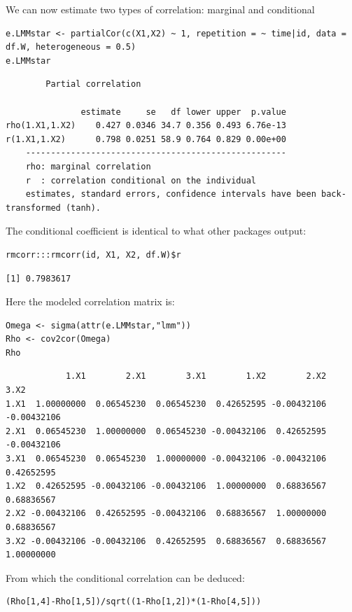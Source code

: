 \documentclass[12pt]{article}
\begin{document}
We can now estimate two types of correlation: marginal and conditional
\lstset{language=r,label= ,caption= ,captionpos=b,numbers=none}
\begin{lstlisting}
e.LMMstar <- partialCor(c(X1,X2) ~ 1, repetition = ~ time|id, data = df.W, heterogeneous = 0.5)
e.LMMstar
\end{lstlisting}

\begin{verbatim}
		Partial correlation 

               estimate     se   df lower upper  p.value
rho(1.X1,1.X2)    0.427 0.0346 34.7 0.356 0.493 6.76e-13
r(1.X1,1.X2)      0.798 0.0251 58.9 0.764 0.829 0.00e+00
	----------------------------------------------------
	rho: marginal correlation 
	r  : correlation conditional on the individual 
	estimates, standard errors, confidence intervals have been back-transformed (tanh).
\end{verbatim}


The conditional coefficient is identical to what other packages output:
\lstset{language=r,label= ,caption= ,captionpos=b,numbers=none}
\begin{lstlisting}
rmcorr:::rmcorr(id, X1, X2, df.W)$r
\end{lstlisting}

\begin{verbatim}
[1] 0.7983617
\end{verbatim}


Here the modeled correlation matrix is:
\lstset{language=r,label= ,caption= ,captionpos=b,numbers=none}
\begin{lstlisting}
Omega <- sigma(attr(e.LMMstar,"lmm"))
Rho <- cov2cor(Omega)
Rho
\end{lstlisting}

\begin{verbatim}
            1.X1        2.X1        3.X1        1.X2        2.X2        3.X2
1.X1  1.00000000  0.06545230  0.06545230  0.42652595 -0.00432106 -0.00432106
2.X1  0.06545230  1.00000000  0.06545230 -0.00432106  0.42652595 -0.00432106
3.X1  0.06545230  0.06545230  1.00000000 -0.00432106 -0.00432106  0.42652595
1.X2  0.42652595 -0.00432106 -0.00432106  1.00000000  0.68836567  0.68836567
2.X2 -0.00432106  0.42652595 -0.00432106  0.68836567  1.00000000  0.68836567
3.X2 -0.00432106 -0.00432106  0.42652595  0.68836567  0.68836567  1.00000000
\end{verbatim}


From which the conditional correlation can be deduced:
\lstset{language=r,label= ,caption= ,captionpos=b,numbers=none}
\begin{lstlisting}
(Rho[1,4]-Rho[1,5])/sqrt((1-Rho[1,2])*(1-Rho[4,5]))
\end{lstlisting}
\end{document}
